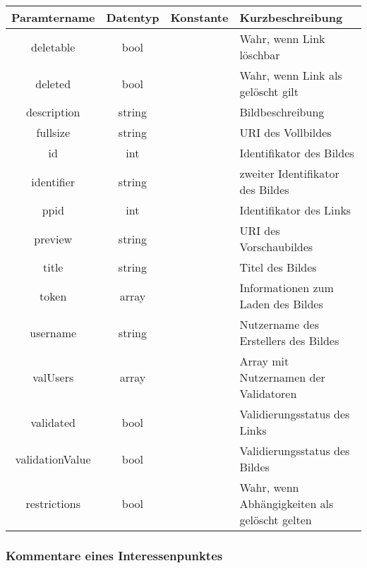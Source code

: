 \begin{table}[H]
	\begin{tabular}{|c|c|c|p{6.5cm}|}
		\hline
		\textbf{Paramtername} & \textbf{Datentyp} & \textbf{Konstante} & \textbf{Kurzbeschreibung}    \\ \hline
		deletable              & bool            &                 & Wahr, wenn Link löschbar \\ \hline
		deleted                & bool            &                 & Wahr, wenn Link als gelöscht gilt \\ \hline
		description            & string          &                 & Bildbeschreibung \\ \hline
		fullsize               & string          &                 & URI des Vollbildes \\ \hline
		id                     & int             &                 & Identifikator des Bildes \\ \hline
		identifier             & string          &                 & zweiter Identifikator des Bildes \\ \hline
		ppid                   & int             &                 & Identifikator des Links \\ \hline
		preview                & string          &                 & URI des Vorschaubildes \\ \hline
		title                  & string          &                 & Titel des Bildes \\ \hline
		token                  & array           &                 & Informationen zum Laden des Bildes \\ \hline
		username               & string          &                 & Nutzername des Erstellers des Bildes \\ \hline
		valUsers               & array           &                 & Array mit Nutzernamen der Validatoren \\ \hline
		validated              & bool            &                 & Validierungsstatus des Links \\ \hline
		validationValue        & bool            &                 & Validierungsstatus des Bildes \\ \hline
		restrictions           & bool            &                 & Wahr, wenn Abhängigkeiten als gelöscht gelten \\ \hline
	\end{tabular}
\end{table}

\subsubsection{Kommentare eines Interessenpunktes}
